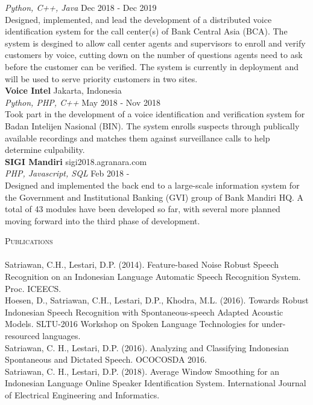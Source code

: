 \documentclass[a4paper]{article}
\newcommand{\lineunder} {
    \vspace*{-8pt} \\
    \hspace*{-18pt} \hrulefill \\
}
\newcommand{\header} [1] {
    {\hspace*{-18pt}\vspace*{6pt} \textsc{#1}}
    \vspace*{-6pt} \lineunder
}
\begin{document}
{\sl Python, C++, Java} \hfill Dec 2018 - Dec 2019 \\
\vspace*{1mm}
Designed, implemented, and lead the development of a distributed voice
identification system for the call center(s) of Bank Central Asia (BCA).
The system is desgined to allow call center agents and supervisors to enroll
and verify customers by voice, cutting down on the number of questions agents
need to ask before the customer can be verified. The system is currently in deployment and will be used to serve priority customers in two sites.\\
\vspace*{3mm}
{\textbf{Voice Intel}} \hfill Jakarta, Indonesia \\
{\sl Python, PHP, C++} \hfill May 2018 - Nov 2018 \\
\vspace*{1mm}
Took part in the development of a voice identification and verification system
for Badan Intelijen Nasional (BIN). The system enrolls suspects through
publically available recordings and matches them against surveillance calls to
help determine culpability.\\
\vspace*{3mm}
{\textbf{SIGI Mandiri}}  \hfill sigi2018.agranara.com\\
{\sl PHP, Javascript, SQL} \hfill Feb 2018 - \\
\vspace*{1mm}
Designed and implemented the back end to a large-scale information system for
the Government and Institutional Banking (GVI) group of Bank Mandiri HQ. A
total of 43 modules have been developed so far, with several more planned
moving forward into the third phase of development.\\
\vspace*{3mm}

\header{Publications}
\vspace{2mm}
Satriawan, C.H., Lestari, D.P. (2014). Feature-based Noise Robust Speech Recognition on an Indonesian Language Automatic Speech Recognition System.
Proc. ICEECS.\\
\vspace*{3mm}
Hoesen, D., Satriawan, C.H., Lestari, D.P., Khodra, M.L. (2016). Towards Robust Indonesian Speech Recognition with Spontaneous-speech Adapted Acoustic Models.
SLTU-2016 Workshop on Spoken Language Technologies for under-resourced
languages.\\
\vspace*{3mm}
Satriawan, C. H., Lestari, D.P. (2016). Analyzing and Classifying Indonesian Spontaneous and Dictated Speech. OCOCOSDA 2016.\\
\vspace*{3mm}
Satriawan, C. H., Lestari, D.P. (2018). Average Window Smoothing for an
Indonesian Language Online Speaker Identification System.
International Journal of Electrical Engineering and Informatics.\\

\ 
\end{document}
